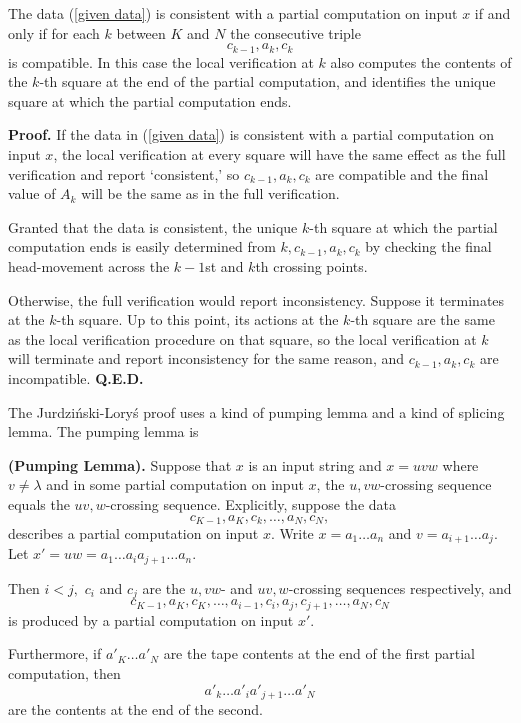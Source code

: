 \begin{theorem}
\label{thm: nasc for consistency}
The data (\ref{given data}) is consistent with
a partial computation on input $x$ if and only
if for each $k$ between $K$ and $N$ the consecutive triple
$$ c_{k-1}, a_k, c_k $$ is compatible.  In this case
the local verification at $k$ also computes the
contents of the $k$-th square at the end of the
partial computation, and identifies the unique square
at which the partial computation ends.
\end{theorem}

{\bf Proof.}
If the data in (\ref{given data}) is consistent
with a partial computation on input $x$,  the local
verification at every square will have the same effect as
the full verification and report `consistent,'
so $c_{k-1}, a_k, c_k$ are compatible
and the final value of $A_k$ will be the same as
in the full verification.

Granted that the data is consistent, the
unique $k$-th square at which the partial computation
ends is easily determined from $k, c_{k-1}, a_k, c_k$
by checking the final head-movement across
the $k-1$st and $k$th crossing points.

Otherwise, the full verification would
report inconsistency.  Suppose it terminates
at the $k$-th square.
Up to this point, its actions at the $k$-th square
are the same as the local verification procedure on that square, so the local
verification at $k$ will terminate and report inconsistency for
the same reason, and $c_{k-1}, a_k, c_k$ are incompatible.
{\bf Q.E.D.}\medskip


The Jurdzi\'nski-Lory\'s proof uses a kind of pumping lemma
and a kind of splicing lemma.  The pumping lemma is

\begin{corollary}
\label{cor: pumping}
{\bf (Pumping Lemma).}
Suppose that $x$ is an input string and $x=uvw$
where $v\not=\lambda$ and in some partial
computation on input $x$, the $u,vw$-crossing
sequence equals the $uv,w$-crossing sequence.
Explicitly, suppose the data
\begin{equation}
\label{eq: pumping data 1}
c_{K-1}, a_K, c_k, \ldots, a_N, c_N, 
\end{equation}
describes a
partial computation on input $x$. Write
$x = a_1 \ldots a_n$ and $v = a_{i+1} \ldots a_j$.
Let $x' = uw= a_1 \ldots a_i a_{j+1} \ldots a_n$.

Then $i<j,$ $c_i$ and $c_j$ are the $u,vw$- and $uv,w$-crossing
sequences respectively, and
\begin{equation}
\label{eq: pumping data 2}
c_{K-1}, a_K, c_K, \ldots, a_{i-1}, c_i, a_j, c_{j+1}, \ldots, a_N, c_N
\end{equation} is
produced by a partial computation on input $x'$.

Furthermore, if $a'_K \ldots a'_N$ are the tape contents
at the end of the first partial computation, then
$$ a'_k \ldots a'_i a'_{j+1} \ldots a'_N$$ are the
contents at the end of the second.
\end{corollary}

